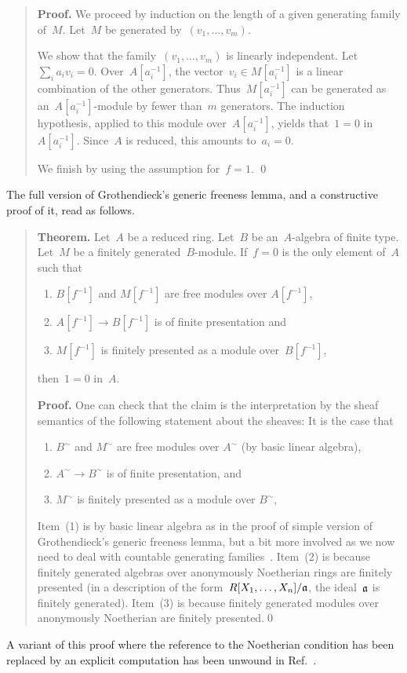 \documentclass{ws-rv9x6}
\begin{document}
{\begin{quote}\textbf{Proof.}
We proceed by induction on the length of a given generating family
of~$M$. Let~$M$ be generated by~$(v_1,\ldots,v_m)$.

We show that the family~$(v_1,\ldots,v_m)$ is linearly independent. Let~$\sum_i
a_i v_i = 0$. Over~$A[a_i^{-1}]$, the vector~$v_i \in M[a_i^{-1}]$ is a linear
combination of the other generators. Thus~$M[a_i^{-1}]$ can be generated as
an~$A[a_i^{-1}]$-module by fewer than~$m$ generators. The induction hypothesis,
applied to this module over~$A[a_i^{-1}]$, yields that~$1 = 0$ in~$A[a_i^{-1}]$. Since~$A$ is
reduced, this amounts to~$a_i = 0$.

We finish by using the assumption for~$f = 1$. \qed
\end{quote}
The full version of Grothendieck's generic freeness lemma, and a constructive
proof of it, read as follows.\par
\begin{quote}
\textbf{Theorem.}
Let~$A$ be a reduced ring. Let~$B$ be an~$A$-algebra of finite type. Let~$M$ be
a finitely generated~$B$-module.
If~$f = 0$ is the only element of~$A$ such that
\begin{enumerate}
\item $B[f^{-1}]$ and $M[f^{-1}]$ are free modules over $A[f^{-1}]$,
\item $A[f^{-1}] \to B[f^{-1}]$ is of finite presentation and
\item $M[f^{-1}]$ is finitely presented as a module over~$B[f^{-1}]$,
\end{enumerate}
then~$1 = 0$ in~$A$.

\textbf{Proof.} One can check that the claim is the interpretation by the sheaf
semantics of the following statement about the sheaves: It is \notnot the case that
\begin{enumerate}
  \item $B^\sim$ and $M^\sim$ are free modules over $A^\sim$ (by basic linear algebra),
  \item $A^\sim \to B^\sim$ is of finite presentation, and
  \item $M^\sim$ is finitely presented as a module over $B^\sim$,
\end{enumerate}

Item~(1) is by basic linear algebra as in the proof of
simple version of Grothendieck's generic freeness lemma, but a bit more involved as we now need to
deal with countable generating
families~\cite[Theorem~11.16]{blechschmidt:phd}. Item~(2) is because finitely
generated algebras over anonymously Noetherian rings are \notnot finitely
presented (in a description of the form~$R[X_1,\ldots,X_n]/\mathfrak{a}$, the
ideal~$\mathfrak{a}$ is \notnot finitely generated).
Item~(3) is because finitely generated modules over anonymously Noetherian are
\notnot finitely presented.\qed
\end{quote}
A variant of this proof where the reference to the Noetherian condition has
been replaced by an explicit computation has been unwound in
Ref.~.


}
\end{document}

